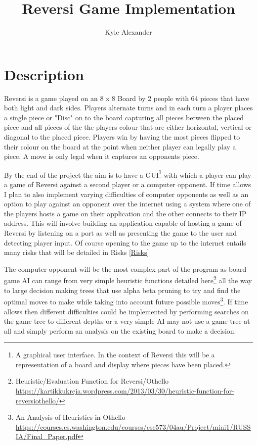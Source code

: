 \documentclass[proposal]{cmpreport}
\title{Reversi Game Implementation}
\author{Kyle Alexander}
\begin{document}
\section{Description}
Reversi is a game played on an 8 x 8 Board by 2 people with 64 pieces that have both light and dark sides. Players alternate turns and in each turn a player places a single piece or "Disc" on to the board capturing all pieces between the placed piece and all pieces of the the players colour that are either horizontal, vertical or diagonal to the placed piece. Players win by having the most pieces flipped to their colour on the board at the point when neither player can legally play a piece. A move is only legal when it captures an opponents piece.

By the end of the project the aim is to have a GUI\footnote{A graphical user interface. In the context of Reversi this will be a representation of a board and display where pieces have been placed.} with which a player can play a game of Reversi against a second player or a computer opponent. If time allows I plan to also implement varying difficulties of computer opponents as well as an option to play against an opponent over the internet using a system where one of the players hosts a game on their application and the other connects to their IP address. This will involve building an application capable of hosting a game of Reversi by listening on a port as well as presenting the game to the user and detecting player input. Of course opening to the game up to the internet entails many risks that will be detailed in Risks \ref{Risks}

The computer opponent will be the most complex part of the program as board game AI can range from very simple heuristic functions detailed here\footnote{Heuristic/Evaluation Function for Reversi/Othello \url{https://kartikkukreja.wordpress.com/2013/03/30/heuristic-function-for-reversiothello/}} all the way to large decision making trees that use alpha beta pruning to try and find the optimal moves to make while taking into account future possible moves\footnote{An Analysis of Heuristics in Othello \url{https://courses.cs.washington.edu/courses/cse573/04au/Project/mini1/RUSSIA/Final_Paper.pdf}}. If time allows then different difficulties could be implemented by performing searches on the game tree to different depths or a very simple AI may not use a game tree at all and simply perform an analysis on the existing board to make a decision.
\end{document}
